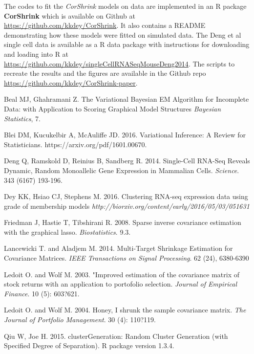 The codes to fit the \textit{CorShrink} models on data are implemented in an R package \textbf{CorShrink} which is available on Github at \url{https://github.com/kkdey/CorShrink}. It also contains a README demonstrating how these models were fitted on simulated data. The Deng et al single cell data \cite{Deng2014} is available as a R data package with instructions for downloading and loading into R at \url{https://github.com/kkdey/singleCellRNASeqMouseDeng2014}.
The scripts to recreate the results and the figures are available in the Github repo \url{https://github.com/kkdey/CorShrink-paper}. 

\begin{thebibliography}{9}

Beal MJ, Ghahramani Z.
The Variational Bayesian EM Algorithm for Incomplete Data: with Application to Scoring Graphical Model Structures
\textit{Bayesian Statistics}, 7.


Blei DM, Kucukelbir A, McAuliffe JD. 2016.
Variational Inference: A Review for Statisticians.
https://arxiv.org/pdf/1601.00670.

Deng Q,  Ramskold D,  Reinius B,  Sandberg R. 2014.
Single-Cell RNA-Seq Reveals Dynamic, Random Monoallelic Gene Expression in Mammalian Cells.
\textit{Science}.  343 (6167) 193-196.

Dey KK,  Hsiao CJ,  Stephens M. 2016.
Clustering RNA-seq expression data using grade of membership models
\textit{http://biorxiv.org/content/early/2016/05/03/051631}

Friedman J,  Hastie T,  Tibshirani R. 2008.
Sparse inverse covariance estimation with the graphical lasso. 
\textit{Biostatistics}. 9.3.

Lancewicki T. and Aladjem M. 2014.
Multi-Target Shrinkage Estimation for Covariance Matrices.
\textit{IEEE Transactions on Signal Processing}. 62 (24), 6380-6390

Ledoit O. and Wolf  M. 2003. 
"Improved estimation of the covariance matrix of stock returns with an application to portofolio selection.
\textit{Journal of Empirical Finance}. 10 (5): 603?621.

Ledoit O. and Wolf  M. 2004. 
Honey, I shrunk the sample covariance matrix.
\textit{The Journal of Portfolio Management}. 30 (4): 110?119.

Qiu W, Joe H. 2015.
clusterGeneration: Random Cluster Generation (with Specified Degree of Separation).
R package version 1.3.4.


\end{thebibliography}
